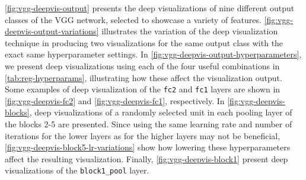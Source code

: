 \noindent \autoref{fig:vgg-deepvis-output} presents the deep visualizations of nine different output classes of the VGG network, selected to showcase a variety of features. \autoref{fig:vgg-deepvis-output-variations} illustrates the variation of the deep visualization technique in producing two visualizations for the same output class with the exact same hyperparameter settings. In \autoref{fig:vgg-deepvis-output-hyperparameters}, we present deep visualizations using each of the four useful combinations in \autoref{tab:reg-hyperparams}, illustrating how these affect the visualization output. \\

\noindent Some examples of deep visualization of the \texttt{fc2} and \texttt{fc1} layers are shown in \autoref{fig:vgg-deepvis-fc2} and \autoref{fig:vgg-deepvis-fc1}, respectively. In \autoref{fig:vgg-deepvis-blocks}, deep visualizations of a randomly selected unit in each pooling layer of the blocks 2-5 are presented. Since using the same learning rate and number of iterations for the lower layers as for the higher layers may not be beneficial, \autoref{fig:vgg-deepvis-block5-lr-variations} show how lowering these hyperparameters affect the resulting visualization. Finally, \autoref{fig:vgg-deepvis-block1} present deep visualizations of the \texttt{block1\_pool} layer.

